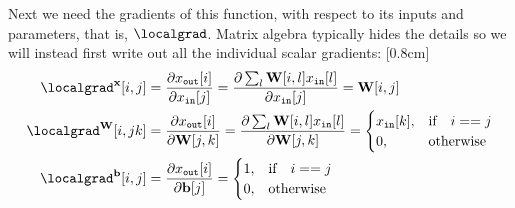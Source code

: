 Next we need the gradients of this function, with respect to its inputs and parameters, that is, $\localgrad$. Matrix algebra typically hides the details so we will instead first write out all the individual scalar gradients:
[0.8cm]
\begin{align}
    \localgrad^{\mathbf{x}}[i,j] &= \frac{\partial x_{\texttt{out}}[i]}{\partial x_{\texttt{in}}[j]} = 
    \frac{\partial \sum_l \mathbf{W}[i,l] x_{\texttt{in}}[l]}{\partial x_{\texttt{in}}[j]} = \mathbf{W}[i,j] \label{lingrad1}\\
    \localgrad^{\mathbf{W}}[i,jk] &= \frac{\partial x_{\texttt{out}}[i]}{\partial \mathbf{W}[j,k]} = \frac{\partial \sum_l \mathbf{W}[i,l] x_{\texttt{in}}[l]}{\partial \mathbf{W}[j,k]} = 
    \begin{cases}
        x_{\texttt{in}}[k], &\text{if} \quad i == j\\
        0,      & \text{otherwise}
    \end{cases} \label{lingrad2}\\
    \localgrad^{\mathbf{b}}[i,j] &= \frac{\partial x_{\texttt{out}}[i]}{\partial \mathbf{b}[j]} = 
    \begin{cases}
        1, &\text{if} \quad i == j\\
        0, & \text{otherwise}
    \end{cases} \label{lingrad3}
\end{align}

